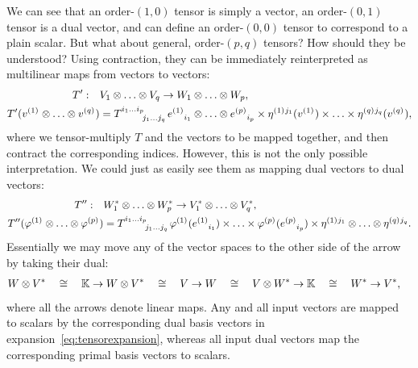 We can see that an order-$(1,0)$ tensor is simply a vector,
an order-$(0,1)$ tensor is a dual vector,
and can define an order-$(0,0)$ tensor to correspond to a plain scalar.
But what about general, order-$(p,q)$ tensors?
How should they be understood?
Using contraction, they can be immediately
reinterpreted as multilinear maps from vectors to vectors:
\begin{align}
\label{eq:Tmultilin}
\notag
T':\quad& V_1 \otimes \ldots \otimes V_q \to W_1 \otimes \ldots \otimes W_p,\\
T'(v\spidx{1}{}{} \otimes \ldots \otimes v\spidx{q}{}{}) &=
T\indices{^{i_1 \ldots i_p}_{j_1 \ldots j_q}}
\bv\spidx{1}{}{i_1} \otimes \ldots \otimes \bv\spidx{p}{}{i_p}
\times
\eta\spidx{1}{j_1}{}(v\spidx{1}{}{}) \times \ldots \times \eta\spidx{q}{j_q}{}(v\spidx{q}{}{}),
\end{align}
where we tensor-multiply $T$ and the vectors to be mapped together, and then contract the corresponding indices.
However, this is not the only possible interpretation.
We could just as easily see them as mapping dual vectors to dual vectors:
\begin{align}
\label{eq:Tmultilin2}
\notag
T'':\quad& W^*_1 \otimes \ldots \otimes W^*_p \to V^*_1 \otimes \ldots \otimes V^*_q,\\
T''(\varphi\spidx{1}{}{} \otimes \ldots \otimes \varphi\spidx{p}{}{}) &=
T\indices{^{i_1 \ldots i_p}_{j_1 \ldots j_q}}
\varphi\spidx{1}{}{}(\bv\spidx{1}{}{i_1}) \times \ldots \times \varphi\spidx{p}{}{}(\bv\spidx{p}{}{i_p})
\times
\eta\spidx{1}{j_1}{} \otimes \ldots \otimes \eta\spidx{q}{j_q}{}.
\end{align}
Essentially we may move any of the vector spaces to the
other side of the arrow by taking their dual:
\begin{align}
\label{eq:tensor-interp}
&W \otimes V^*
\quad \cong \quad
{\mathbb K} \to W \otimes V^*
\quad \cong \quad
V \to W
\quad \cong \quad
V \otimes W^* \to {\mathbb K}
\quad \cong \quad
W^* \to V^*,
\end{align}
where all the arrows denote linear maps.
Any and all input vectors are mapped to scalars by the corresponding
dual basis vectors in expansion~\eqref{eq:tensorexpansion}, whereas all input dual vectors map the
corresponding primal basis vectors to scalars.

